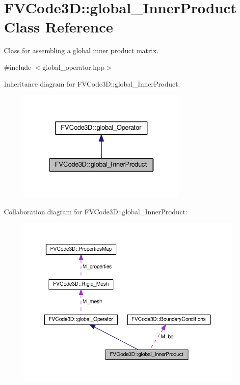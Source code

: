 \hypertarget{classFVCode3D_1_1global__InnerProduct}{}\section{F\+V\+Code3D\+:\+:global\+\_\+\+Inner\+Product Class Reference}
\label{classFVCode3D_1_1global__InnerProduct}


Class for assembling a global inner product matrix.  




{\ttfamily \#include $<$global\+\_\+operator.\+hpp$>$}



Inheritance diagram for F\+V\+Code3D\+:\+:global\+\_\+\+Inner\+Product\+:
\nopagebreak
\begin{figure}[H]
\begin{center}
\leavevmode
\includegraphics[width=238pt]{classFVCode3D_1_1global__InnerProduct__inherit__graph}
\end{center}
\end{figure}


Collaboration diagram for F\+V\+Code3D\+:\+:global\+\_\+\+Inner\+Product\+:
\nopagebreak
\begin{figure}[H]
\begin{center}
\leavevmode
\includegraphics[width=350pt]{classFVCode3D_1_1global__InnerProduct__coll__graph}
\end{center}
\end{figure}
